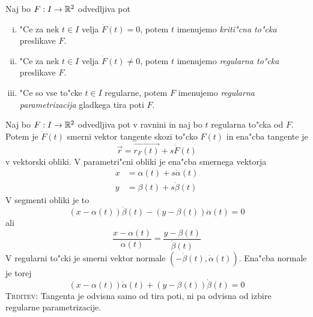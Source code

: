 Naj bo $F: I \to \mathbb{R}^2$ odvedljiva pot
\begin{enumerate}[(i)]
	\item "Ce za nek $t \in I$ velja $\dot{F}(t) = 0$, potem $t$ imenujemo \emph{kriti"cna to"cka} preslikave $F$.
	\item "Ce za nek $t \in I$ velja $\dot{F}(t) \neq 0$, potem $t$ imenujemo \emph{regularna to"cka} preslikave $F$.
	\item "Ce so vse to"cke $t \in I$ regularne, potem $F$ imenujemo \emph{regularna parametrizacija} gladkega tira poti $F$.
\end{enumerate}
%
Naj bo $F: I \to \mathbb{R}^2$ odvedljiva pot v ravnini in naj bo $t$ regularna to"cka od $F$. Potem je $\dot{F}(t)$ smerni vektor tangente skozi to"cko $F(t)$ in ena"cba tangente je
\begin{equation*}
\vec{r} = \vec{r_F(t)} + s \dot{F}(t)
\end{equation*}
v vektorski obliki. V parametri"cni obliki je ena"cba smernega vektorja
\begin{align*}
x &= \alpha(t) + s \dot{\alpha}(t) \\
y &= \beta(t) + s \dot{\beta}(t)
\end{align*}
V segmenti obliki je to
\begin{equation*}
(x - \alpha(t)) \dot{\beta}(t) - (y - \beta(t)) \dot{\alpha}(t) = 0
\end{equation*}
ali
\begin{equation*}
\dfrac{x - \alpha(t)}{\dot{\alpha}(t)} = \dfrac{y - \beta(t)}{\dot{\beta}(t)}
\end{equation*}
V regularni to"cki je smerni vektor normale $(-\dot{\beta}(t), \dot{\alpha}(t))$. Ena"cba normale je torej
\begin{equation*}
(x - \alpha(t)) \dot{\alpha}(t) + (y - \beta(t)) \dot{\beta}(t) = 0
\end{equation*}
%
\textsc{Trditev:} Tangenta je odvisna samo od tira poti, ni pa odvisna od izbire regularne parametrizacije.

